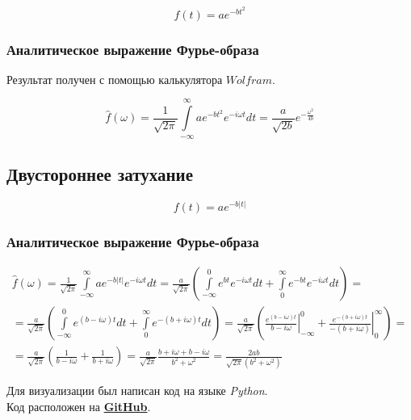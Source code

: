 \documentclass[a5paper, 10pt]{article}
\theoremstyle{definition}
\theoremstyle{plain}
\theoremstyle{remark}
\begin{document}
\begin{equation}
f(t) = a e^{-bt^2}
\end{equation}


\subsubsection{Аналитическое выражение Фурье-образа}

Результат получен с помощью калькулятора $Wolfram$.

\begin{equation}
\hat{f}(\omega) =
 \frac{1}{\sqrt{2 \pi}} \int \limits_{-\infty}^{\infty}  a e^{-bt^2} e^{-i \omega t} dt = \frac{a}{\sqrt{2b}} e^{-\frac{\omega^2}{4b}}
\end{equation}






\newpage
\subsection{Двустороннее затухание}

\begin{equation}
f(t) = a e^{-b|t|}
\end{equation}


\subsubsection{Аналитическое выражение Фурье-образа}

\begin{multline}
\hat{f}(\omega) =
 \frac{1}{\sqrt{2 \pi}} \int \limits_{-\infty}^{\infty} a e^{-b|t|} e^{-i \omega t} dt =  \frac{a}{\sqrt{2 \pi}}  \left( \int \limits_{-\infty}^{0} e^{b t} e^{-i \omega t} dt  + \int \limits_{0}^{\infty} e^{-b t} e^{-i \omega t} dt  \right) = \\
=  \frac{a}{\sqrt{2 \pi}}  \left( \int \limits_{-\infty}^{0} e^{(b-i \omega) t} dt  + \int \limits_{0}^{\infty}e^{-(b + i \omega) t} dt  \right) 
= \frac{a}{\sqrt{2 \pi}}  \left(  \left. \frac{e^{(b-i \omega) t}}{b-i \omega} \right|_{-\infty}^{0} + \left. \frac{e^{-(b + i \omega) t}}{-(b + i \omega)} \right|_{0}^{\infty}  \right) =\\
=\frac{a}{\sqrt{2 \pi}}  \left( \frac{1}{b-i \omega} + \frac{1}{b + i \omega}  \right) =
\frac{a}{\sqrt{2 \pi}}   \frac{b + i \omega +b - i \omega}{b^2 + \omega^2} = \frac{2ab}{\sqrt{2 \pi} (b^2 + \omega^2)}
\end{multline}






Для визуализации был написан код на языке \textit{Python}. \\
Код расположен на \href{https://github.com/a-nechaeva/practical_Linal/tree/main/lab4}{\textbf{GitHub}}.
\end{document}
